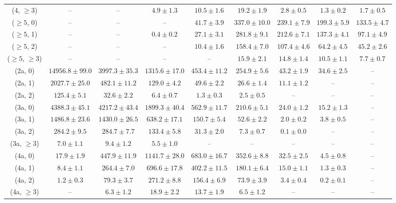 \begin{table}[h!]
{\begin{tabular}{ccccccccc}
	(4, $\ge3$) & -- & -- & $4.9\pm 1.3$ & $10.5\pm 1.6$ & $19.2\pm 1.9$ & $2.8\pm 0.5$ & $1.3\pm 0.2$ & $1.7\pm 0.5$ \\[0.5ex] 
	($\ge5$, 0) & -- & -- & -- & $41.7\pm 3.9$ & $337.0\pm 10.0$ & $239.1\pm 7.9$ & $199.3\pm 5.9$ & $133.5\pm 4.7$ \\[0.5ex] 
	($\ge5$, 1) & -- & -- & $0.4\pm 0.2$ & $27.1\pm 3.1$ & $281.8\pm 9.1$ & $212.6\pm 7.1$ & $137.3\pm 4.1$ & $97.1\pm 4.9$ \\[0.5ex] 
	($\ge5$, 2) & -- & -- & -- & $10.4\pm 1.6$ & $158.4\pm 7.0$ & $107.4\pm 4.6$ & $64.2\pm 4.5$ & $45.2\pm 2.6$ \\[0.5ex] 
	($\ge5$, $\ge3$) & -- & -- & -- & -- & $15.9\pm 2.1$ & $14.8\pm 1.4$ & $10.5\pm 1.1$ & $7.7\pm 0.7$ \\[0.5ex] 
	(2a, 0) & $14956.8\pm 99.0$ & $3997.3\pm 35.3$ & $1315.6\pm 17.0$ & $453.4\pm 11.2$ & $254.9\pm 5.6$ & $43.2\pm 1.9$ & $34.6\pm 2.5$ & -- \\[0.5ex] 
	(2a, 1) & $2027.7\pm 25.0$ & $482.1\pm 11.2$ & $129.0\pm 4.2$ & $49.6\pm 2.2$ & $26.6\pm 1.4$ & $11.1\pm 1.2$ & -- & -- \\[0.5ex] 
	(2a, 2) & $125.4\pm 5.1$ & $32.6\pm 2.2$ & $6.4\pm 0.7$ & $1.3\pm 0.3$ & $2.5\pm 0.5$ & -- & -- & -- \\[0.5ex] 
	(3a, 0) & $4388.3\pm 45.1$ & $4217.2\pm 43.4$ & $1899.3\pm 40.4$ & $562.9\pm 11.7$ & $210.6\pm 5.1$ & $24.0\pm 1.2$ & $15.2\pm 1.3$ & -- \\[0.5ex] 
	(3a, 1) & $1486.8\pm 23.6$ & $1430.0\pm 26.5$ & $638.2\pm 17.1$ & $150.7\pm 5.4$ & $52.6\pm 2.2$ & $2.0\pm 0.2$ & $3.8\pm 0.5$ & -- \\[0.5ex] 
	(3a, 2) & $284.2\pm 9.5$ & $284.7\pm 7.7$ & $133.4\pm 5.8$ & $31.3\pm 2.0$ & $7.3\pm 0.7$ & $0.1\pm 0.0$ & -- & -- \\[0.5ex] 
	(3a, $\ge3$) & $7.0\pm 1.1$ & $9.4\pm 1.2$ & $5.5\pm 1.0$ & -- & -- & -- & -- & -- \\[0.5ex] 
	(4a, 0) & $17.9\pm 1.9$ & $447.9\pm 11.9$ & $1141.7\pm 28.0$ & $683.0\pm 16.7$ & $352.6\pm 8.8$ & $32.5\pm 2.5$ & $4.5\pm 0.8$ & -- \\[0.5ex] 
	(4a, 1) & $8.4\pm 1.1$ & $264.4\pm 7.0$ & $696.6\pm 17.8$ & $402.2\pm 11.5$ & $180.1\pm 6.4$ & $15.0\pm 1.1$ & $1.3\pm 0.3$ & -- \\[0.5ex] 
	(4a, 2) & $1.2\pm 0.3$ & $79.3\pm 3.7$ & $271.2\pm 8.8$ & $156.4\pm 6.9$ & $73.9\pm 3.9$ & $3.4\pm 0.4$ & $0.2\pm 0.1$ & -- \\[0.5ex] 
	(4a, $\ge3$) & -- & $6.3\pm 1.2$ & $18.9\pm 2.2$ & $13.7\pm 1.9$ & $6.5\pm 1.2$ & -- & -- & -- \\[0.5ex] 

\end{tabular}}
\end{table}

